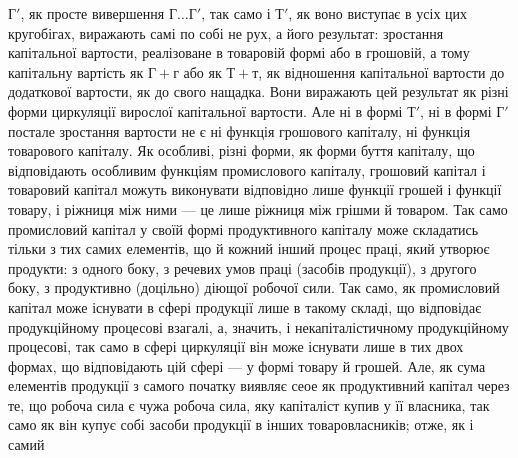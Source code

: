 $Г'$, як просте вивершення $Г\dots{} Г'$, так само і $Т'$, як воно виступає
в усіх цих кругобігах, виражають самі по собі не рух, а його результат:
зростання капітальної вартости, реалізоване в товаровій формі або в грошовій,
а тому капітальну вартість як $Г + г$ або як $Т + т$, як відношення
капітальної вартости до додаткової вартости, як до свого нащадка. Вони
виражають цей результат як різні форми циркуляції вирослої капітальної
вартости. Але ні в формі $Т'$, ні в формі $Г'$ постале зростання вартости
не є ні функція грошового капіталу, ні функція товарового капіталу. Як
особливі, різні форми, як форми буття капіталу, що відповідають особливим
функціям промислового капіталу, грошовий капітал і товаровий капітал
можуть виконувати відповідно лише функції грошей і функції товару,
і ріжниця між ними — це лише ріжниця між грішми й товаром. Так само
промисловий капітал у своїй формі продуктивного капіталу може складатись
тільки з тих самих елементів, що й кожний інший процес праці,
який утворює продукти: з одного боку, з речевих умов праці (засобів
продукції), з другого боку, з продуктивно (доцільно) діющої робочої
сили. Так само, як промисловий капітал може існувати в сфері продукції
лише в такому складі, що відповідає продукційному процесові взагалі,
а, значить, і некапіталістичному продукційному процесові, так само в сфері
циркуляції він може існувати лише в тих двох формах, що відповідають
цій сфері — у формі товару й грошей. Але, як сума елементів продукції
з самого початку виявляє сеое як продуктивний капітал через те, що робоча
сила є чужа робоча сила, яку капіталіст купив у її власника, так само як
він купує собі засоби продукції в інших товаровласників; отже, як і самий
\parbreak{}  %
